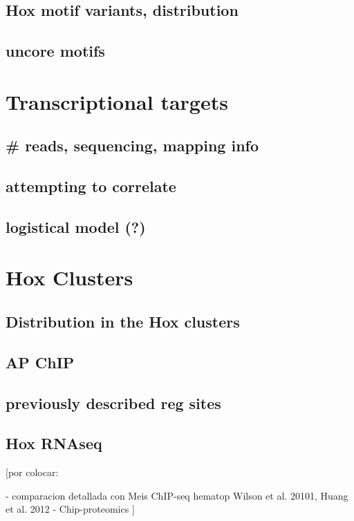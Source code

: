 \subsection{Hox motif variants, distribution}

\subsection{uncore motifs}

\section{Transcriptional targets}

\subsection{\# reads, sequencing, mapping info}

\subsection{attempting to correlate}

\subsection{logistical model (?)}

\section{Hox Clusters}

\subsection{Distribution in the Hox clusters}

\subsection{AP ChIP}

\subsection{previously described reg sites}

\subsection{Hox RNAseq}


[por colocar:

- comparacion detallada con Meis ChIP-seq hematop {Wilson et al. 20101, Huang et al. 2012}
- Chip-proteomics
]
